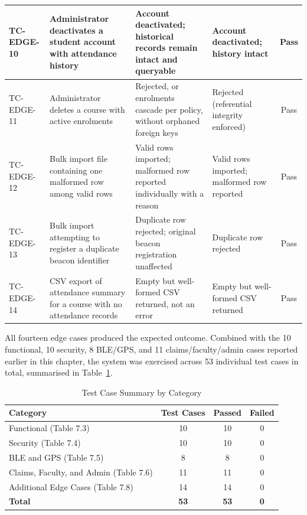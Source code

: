 \documentclass[12pt, a4paper, oneside]{report}
\begin{document}
\begin{table}[htbp]
\begin{tabularx}{\textwidth}{|l|X|X|X|c|}
TC-EDGE-10 & Administrator deactivates a student account with attendance history & Account deactivated; historical records remain intact and queryable & Account deactivated; history intact & Pass \\
\hline
TC-EDGE-11 & Administrator deletes a course with active enrolments & Rejected, or enrolments cascade per policy, without orphaned foreign keys & Rejected (referential integrity enforced) & Pass \\
\hline
TC-EDGE-12 & Bulk import file containing one malformed row among valid rows & Valid rows imported; malformed row reported individually with a reason & Valid rows imported; malformed row reported & Pass \\
\hline
TC-EDGE-13 & Bulk import attempting to register a duplicate beacon identifier & Duplicate row rejected; original beacon registration unaffected & Duplicate row rejected & Pass \\
\hline
TC-EDGE-14 & CSV export of attendance summary for a course with no attendance records & Empty but well-formed CSV returned, not an error & Empty but well-formed CSV returned & Pass \\
\hline
\end{tabularx}
\end{table}

All fourteen edge cases produced the expected outcome. Combined with the 10 functional, 10 security, 8 BLE/GPS, and 11 claims/faculty/admin cases reported earlier in this chapter, the system was exercised across 53 individual test cases in total, summarised in Table~\ref{tab:test-summary}.

\begin{table}[htbp]
\centering
\caption{Test Case Summary by Category}
\label{tab:test-summary}
\begin{tabularx}{\textwidth}{|X|c|c|c|}
\hline
\textbf{Category} & \textbf{Test Cases} & \textbf{Passed} & \textbf{Failed} \\
\hline
Functional (Table 7.3) & 10 & 10 & 0 \\
\hline
Security (Table 7.4) & 10 & 10 & 0 \\
\hline
BLE and GPS (Table 7.5) & 8 & 8 & 0 \\
\hline
Claims, Faculty, and Admin (Table 7.6) & 11 & 11 & 0 \\
\hline
Additional Edge Cases (Table 7.8) & 14 & 14 & 0 \\
\hline
\textbf{Total} & \textbf{53} & \textbf{53} & \textbf{0} \\
\hline
\end{tabularx}
\end{table}
\end{document}
